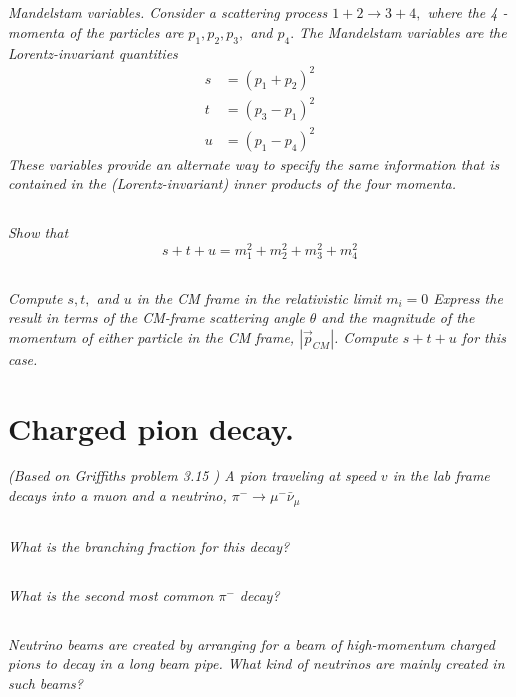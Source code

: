 \documentclass{article}
\begin{document}
\section{}
\textit{Mandelstam variables. Consider a scattering process $1+2 \rightarrow 3+4,$ where the 4 -momenta of the particles are $p_{1}, p_{2}, p_{3},$ and $p_{4} .$ The Mandelstam variables are the Lorentz-invariant quantities
$$
\begin{aligned}
s &=\left(p_{1}+p_{2}\right)^{2} \\
t &=\left(p_{3}-p_{1}\right)^{2} \\
u &=\left(p_{1}-p_{4}\right)^{2}
\end{aligned}
$$
These variables provide an alternate way to specify the same information that is contained in the (Lorentz-invariant) inner products of the four momenta.}
\subsection{}
\textit{Show that
$$
s+t+u=m_{1}^{2}+m_{2}^{2}+m_{3}^{2}+m_{4}^{2}
$$}

\subsection{}
\textit{Compute $s, t,$ and $u$ in the CM frame in the relativistic limit $m_{i}=0$ Express the result in terms of the CM-frame scattering angle $\theta$ and the magnitude of the momentum of either particle in the CM frame, $\left|\vec{p}_{C M}\right|$. Compute $s+t+u$ for this case.}


\newpage


\section{Charged pion decay.}
\textit{(Based on Griffiths problem 3.15 ) A pion traveling at speed $v$ in the lab frame decays into a muon and a neutrino, $\pi^{-} \rightarrow \mu^{-} \bar{\nu}_{\mu}$}
\subsection{}
\textit{What is the branching fraction for this decay?}


\subsection{} 
\textit{What is the second most common $\pi^{-}$ decay?}

\subsection{} 
\textit{Neutrino beams are created by arranging for a beam of high-momentum charged pions to decay in a long beam pipe. What kind of neutrinos are mainly created in such beams?}
\end{document}
